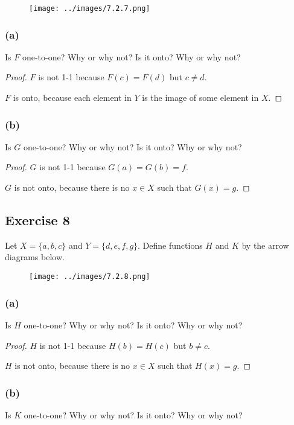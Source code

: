 \documentclass[14pt]{extarticle}
\begin{document}
\begin{figure}[ht!]
    \centering
    \texttt{[image: ../images/7.2.7.png]}
\end{figure}

\subsubsection{(a)}
Is $F$ one-to-one? Why or why not? Is it onto? Why or why not?

\begin{proof}
    $F$ is not 1-1 because $F(c) = F(d)$ but $c \neq d$.

    $F$ is onto, because each element in $Y$ is the image of some element in $X$.
\end{proof}

\subsubsection{(b)}
Is $G$ one-to-one? Why or why not? Is it onto? Why or why not?

\begin{proof}
    $G$ is not 1-1 because $G(a) = G(b) = f$.

    $G$ is not onto, because there is no $x \in X$ such that $G(x) = g$.
\end{proof}

\subsection{Exercise 8}
Let \(X = \{a, b, c\}\) and \(Y = \{d, e, f, g\}\). Define
functions $H$ and $K$ by the arrow diagrams below.

\begin{figure}[ht!]
    \centering
    \texttt{[image: ../images/7.2.8.png]}
\end{figure}

\subsubsection{(a)}
Is $H$ one-to-one? Why or why not? Is it onto? Why or why not?

\begin{proof}
    $H$ is not 1-1 because \(H(b) = H(c)\) but \(b \neq c\).

    $H$ is not onto, because there is no $x \in X$ such that $H(x) = g$.
\end{proof}

\subsubsection{(b)}
Is $K$ one-to-one? Why or why not? Is it onto? Why or why not?
\end{document}
